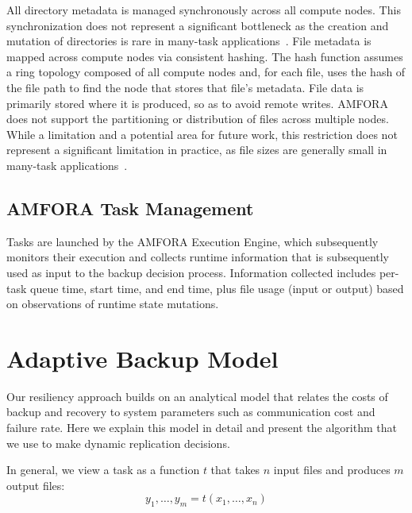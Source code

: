 \documentclass{sig-alternate}
\begin{document}
All directory metadata is managed synchronously across all compute nodes. This synchronization does not represent
a significant bottleneck as the creation 
and mutation of directories is rare in many-task applications~\cite{MTC-Bluewaters}.
File metadata is mapped across compute nodes via consistent hashing. 
The hash function assumes a ring topology composed of all compute nodes and, for each file,
uses the hash of the file path to find the node that stores that file's metadata.
File data is primarily stored where it is produced, so as to avoid remote writes. AMFORA does not
support the partitioning or distribution of files across multiple nodes. While a limitation and 
a potential area for future work, this restriction does not represent a significant limitation in practice, as file sizes are generally
small in many-task applications~\cite{MTC-Bluewaters}. 

\subsection{AMFORA Task Management}
Tasks are launched by the AMFORA Execution Engine, which subsequently monitors their execution and collects runtime information
that is subsequently used as input to the backup decision process.
Information collected includes per-task queue time, start time, and end time, plus file usage (input or output) based on observations
of runtime state mutations.




\section{Adaptive Backup Model}
\label{sec:Model}

Our resiliency approach builds on an analytical model that relates the costs of backup and recovery to system parameters
such as communication cost and failure rate.
Here we explain this model in detail and present the algorithm that we use to make dynamic replication decisions. 

In general, we view a task as a function $t$ that takes $n$ input files and produces $m$ output files:
\begin{equation}
y_{1}, \ldots, y_{m} = t(x_{1}, \ldots, x_{n})
\end{equation}
\end{document}

